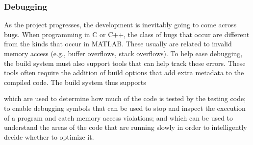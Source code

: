 \subsubsection{Debugging}

As the project progresses, the development is inevitably going to come across
bugs. When programming in C or C++, the class of bugs that occur are different
from the kinds that occur in MATLAB. These usually are related to invalid
memory access (e.g., buffer overflows, stack overflows). To help ease debugging,
the build system must also support tools that can help track these errors.
These tools often require the addition of build options that add extra metadata
to the compiled code. The build system thus supports
%
\begin{enumerate*}[label={}]
	 which are used to determine how
		much of the code is tested by the testing code;
	 to enable debugging symbols that can be
		used to stop and inspect the execution of a program and catch memory access violations; and
	 which can be used to understand the
		areas of the code that are running slowly in order to intelligently decide whether to optimize it.
\end{enumerate*}
